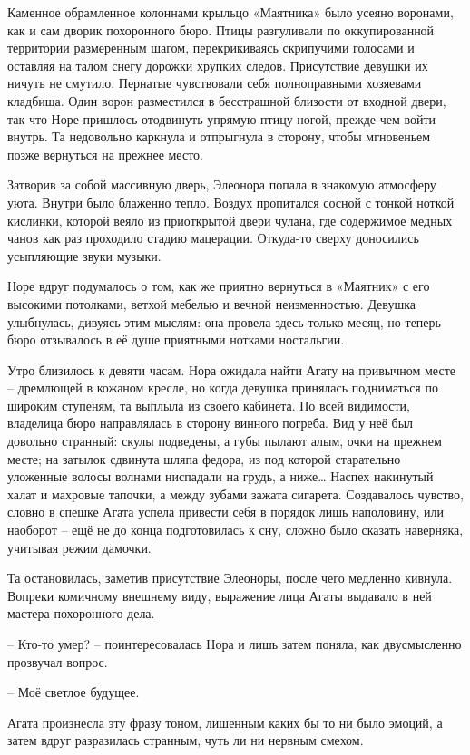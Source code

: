\documentclass[
  a5paperpaper,
  DIV=11,
  numbers=noendperiod]{scrreprt}
\begin{document}
Каменное обрамленное колоннами крыльцо «Маятника» было усеяно воронами,
как и сам дворик похоронного бюро. Птицы разгуливали по оккупированной
территории размеренным шагом, перекрикиваясь скрипучими голосами и
оставляя на талом снегу дорожки хрупких следов. Присутствие девушки их
ничуть не смутило. Пернатые чувствовали себя полноправными хозяевами
кладбища. Один ворон разместился в бесстрашной близости от входной
двери, так что Норе пришлось отодвинуть упрямую птицу ногой, прежде чем
войти внутрь. Та недовольно каркнула и отпрыгнула в сторону, чтобы
мгновеньем позже вернуться на прежнее место.

Затворив за собой массивную дверь, Элеонора попала в знакомую атмосферу
уюта. Внутри было блаженно тепло. Воздух пропитался сосной с тонкой
ноткой кислинки, которой веяло из приоткрытой двери чулана, где
содержимое медных чанов как раз проходило стадию мацерации. Откуда-то
сверху доносились усыпляющие звуки музыки.

Норе вдруг подумалось о том, как же приятно вернуться в «Маятник» с его
высокими потолками, ветхой мебелью и вечной неизменностью. Девушка
улыбнулась, дивуясь этим мыслям: она провела здесь только месяц, но
теперь бюро отзывалось в её душе приятными нотками ностальгии.

Утро близилось к девяти часам. Нора ожидала найти Агату на привычном
месте -- дремлющей в кожаном кресле, но когда девушка принялась
подниматься по широким ступеням, та выплыла из своего кабинета. По всей
видимости, владелица бюро направлялась в сторону винного погреба. Вид у
неё был довольно странный: скулы подведены, а губы пылают алым, очки на
прежнем месте; на затылок сдвинута шляпа федора, из под которой
старательно уложенные волосы волнами ниспадали на грудь, а ниже\ldots{}
Наспех накинутый халат и махровые тапочки, а между зубами зажата
сигарета. Создавалось чувство, словно в спешке Агата успела привести
себя в порядок лишь наполовину, или наоборот -- ещё не до конца
подготовилась к сну, сложно было сказать наверняка, учитывая режим
дамочки.

Та остановилась, заметив присутствие Элеоноры, после чего медленно
кивнула. Вопреки комичному внешнему виду, выражение лица Агаты выдавало
в ней мастера похоронного дела.

-- Кто-то умер? -- поинтересовалась Нора и лишь затем поняла, как
двусмысленно прозвучал вопрос.

-- Моё светлое будущее.

Агата произнесла эту фразу тоном, лишенным каких бы то ни было эмоций, а
затем вдруг разразилась странным, чуть ли ни нервным смехом.
\end{document}
